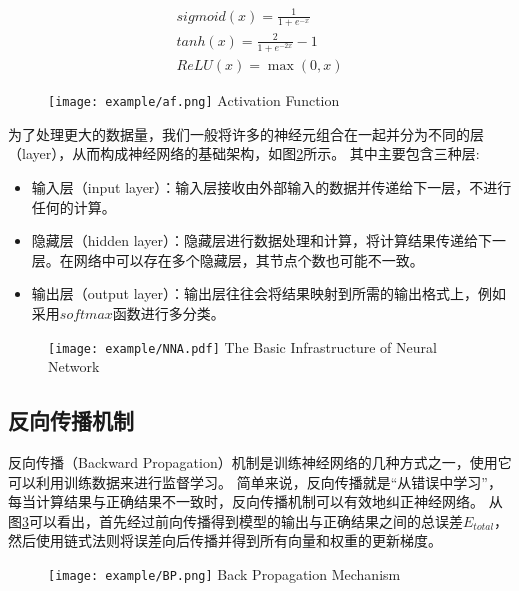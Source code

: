 \begin{gather}
  \label{enl2sql:afeq}
  sigmoid(x) = \frac{1}{1 + e^{-x}}\\
  tanh(x) = \frac{2}{1 + e^{-2x}} - 1\\
  ReLU(x) = \max(0,x)
\end{gather}

\begin{figure}[!htp]
  \centering
  \texttt{[image: example/af.png]}
    {Activation Function}
  \label{fig:af}
\end{figure}

为了处理更大的数据量，我们一般将许多的神经元组合在一起并分为不同的层（layer），从而构成神经网络的基础架构，如图\ref{fig:NNA}所示。
其中主要包含三种层:

\begin{itemize}
  \item 输入层（input layer）：输入层接收由外部输入的数据并传递给下一层，不进行任何的计算。
  \item 隐藏层（hidden layer）：隐藏层进行数据处理和计算，将计算结果传递给下一层。在网络中可以存在多个隐藏层，其节点个数也可能不一致。
  \item 输出层（output layer）：输出层往往会将结果映射到所需的输出格式上，例如采用$softmax$函数进行多分类。
\end{itemize}

\begin{figure}[!htp]
  \centering
  \texttt{[image: example/NNA.pdf]}
    {The Basic Infrastructure of Neural Network}
  \label{fig:NNA}
\end{figure}

\subsection{反向传播机制}

反向传播（Backward Propagation）机制\cite{rumelhart1986learning}是训练神经网络的几种方式之一，使用它可以利用训练数据来进行监督学习。
简单来说，反向传播就是“从错误中学习”，每当计算结果与正确结果不一致时，反向传播机制可以有效地纠正神经网络。
从图\ref{fig:BP}可以看出，首先经过前向传播得到模型的输出与正确结果之间的总误差$E_{total}$，然后使用链式法则将误差向后传播并得到所有向量和权重的更新梯度。

\begin{figure}[!htp]
  \centering
  \texttt{[image: example/BP.png]}
    {Back Propagation Mechanism}
  \label{fig:BP}
\end{figure}

